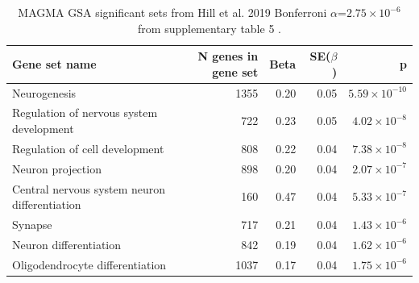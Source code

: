 \begin{table}[ht]
\centering
 \setlength{\extrarowheight}{2pt}
\begin{adjustbox}{width=\textwidth}
\begin{tabular}{lrrrr}
  \toprule
Gene set name & N genes in gene set & Beta & SE($\beta$) & p \\ 
  \midrule
Neurogenesis  & 1355 & 0.20 & 0.05 & $5.59 \times 10^{-10}$ \\ 
  Regulation of nervous system development  & 722 & 0.23 & 0.05 & $4.02 \times 10^{-8}$ \\ 
  Regulation of cell development  & 808 & 0.22 & 0.04 & $7.38 \times 10^{-8}$ \\ 
  Neuron projection  & 898 & 0.20 & 0.04 & $2.07 \times 10^{-7}$ \\ 
  Central nervous system neuron differentiation  & 160 & 0.47 & 0.04 & $5.33 \times 10^{-7}$ \\ 
  Synapse  & 717 & 0.21 & 0.04 & $1.43 \times 10^{-6}$ \\ 
  Neuron differentiation  & 842 & 0.19 & 0.04 & $1.62 \times 10^{-6}$ \\ 
  Oligodendrocyte differentiation  & 1037 & 0.17 & 0.04 & $1.75 \times 10^{-6}$ \\ 
   \bottomrule
\end{tabular}
\end{adjustbox}
\caption[MAGMA GSA significant sets from Hill(2019)]{MAGMA GSA significant sets from Hill et al. 2019 Bonferroni $\alpha$=$2.75\times10^{-6}$ from supplementary table 5   \cite{hill2019combined}.}
\label{tab:MAGMA GSA results from Hill et al.}
\end{table}


